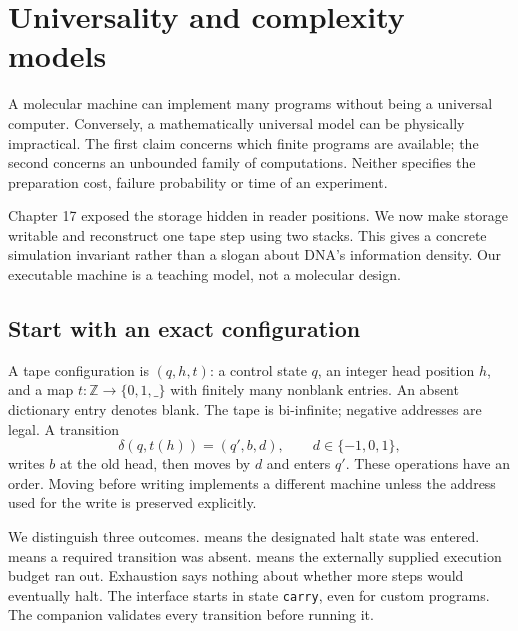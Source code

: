\chapter{Universality and complexity models}
A molecular machine can implement many programs without being a universal
computer. Conversely, a mathematically universal model can be physically
impractical. The first claim concerns which finite programs are available;
the second concerns an unbounded family of computations. Neither specifies
the preparation cost, failure probability or time of an experiment.

Chapter 17 exposed the storage hidden in reader positions. We now make
storage writable and reconstruct one tape step using two stacks. This gives
a concrete simulation invariant rather than a slogan about DNA's information
density. Our executable machine is a teaching model, not a molecular design.

\section{Start with an exact configuration}
A tape configuration is $(q,h,t)$: a control state $q$, an integer head
position $h$, and a map $t:\mathbb Z\to\{0,1,\_\}$ with finitely many
nonblank entries. An absent dictionary entry denotes blank. The tape is
bi-infinite; negative addresses are legal. A transition
\begin{equation}
 \delta(q,t(h))=(q',b,d),\qquad d\in\{-1,0,1\},
\end{equation}
writes $b$ at the old head, then moves by $d$ and enters $q'$. These
operations have an order. Moving before writing implements a different
machine unless the address used for the write is preserved explicitly.


We distinguish three outcomes.  means the designated halt state
was entered.  means a required transition was absent.
 means the externally supplied execution budget ran out.
Exhaustion says nothing about whether more steps would eventually halt.
The interface starts in state \texttt{carry}, even for custom programs.
The companion validates every transition before running it.

